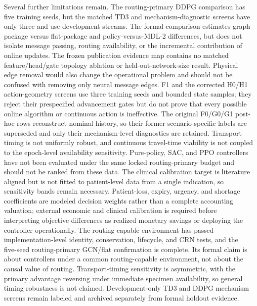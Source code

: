 \documentclass[preprint,review,12pt]{elsarticle}
\begin{document}
Several further limitations remain. The routing-primary DDPG comparison has five
training seeds, but the matched TD3 and mechanism-diagnostic screens have only
three and use development streams. The formal comparison estimates graph-package
versus flat-package and policy-versus-MDL-2 differences, but does not isolate
message passing, routing availability, or the incremental contribution of
online updates. The frozen publication evidence map contains no matched
feature/head/gate topology ablation or held-out-network-size result. Physical
edge removal would also change the operational problem and should not be
confused with removing only neural message edges. F1 and the
corrected H0/H1 action-geometry screens use three training seeds and bounded
state samples; they reject their prespecified advancement gates but do not
prove that every possible online algorithm or continuous action is ineffective.
The original F0/G0/G1 post-hoc rows reconstruct nominal history, so their former
scenario-specific labels are superseded and only their mechanism-level
diagnostics are retained. Transport
timing is not uniformly robust, and continuous travel-time viability is not
coupled to the epoch-level availability sensitivity. Pure-policy, SAC, and PPO
controllers have not been evaluated under the same locked routing-primary
budget and should not be ranked from these data. The clinical calibration
target is literature aligned but is not fitted to patient-level data from a
single indication, so sensitivity bands remain necessary. Patient-loss,
expiry, urgency, and shortage coefficients are modeled decision weights rather
than a complete accounting valuation; external economic and clinical
calibration is required before interpreting objective differences as realized
monetary savings or deploying the controller operationally.
The routing-capable environment has passed implementation-level identity,
conservation, lifecycle, and CRN tests, and the five-seed routing-primary
GCN/flat confirmation is complete. Its formal claim is about controllers under
a common routing-capable environment, not about the causal value of routing.
Transport-timing sensitivity is asymmetric, with the primary advantage
reversing under immediate specimen availability, so general timing robustness
is not claimed. Development-only TD3 and DDPG mechanism screens remain labeled
and archived separately from formal holdout evidence.
\end{document}
